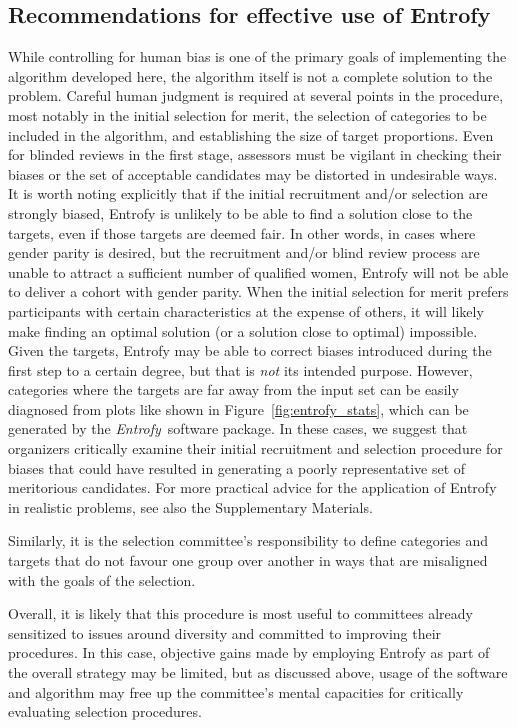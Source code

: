 \documentclass[12pt]{article}
\newcommand{\project}[1]{\textsl{#1}}
\newcommand{\entrofy}{\project{Entrofy}}
\begin{document}
\subsection*{Recommendations for effective use of Entrofy}
\begin{bf}
While controlling for human bias is one of the primary goals of implementing the algorithm developed here, the algorithm itself is not a complete solution to the problem.
Careful human judgment is required at several points in the procedure, most notably in the initial selection for merit, the selection of categories to be included in the algorithm, and establishing the size of target proportions.
Even for blinded reviews in the first stage, assessors must be vigilant in checking their biases or the set of acceptable candidates may be distorted in undesirable ways.
It is worth noting explicitly that if the initial recruitment and/or selection are strongly biased, Entrofy is unlikely to be able to find a solution close to the targets, even if those targets are deemed fair. 
In other words, in cases where gender parity is desired, but the recruitment and/or blind review process are unable to attract a sufficient number of qualified women, Entrofy will not be able to deliver a cohort with gender parity.
When the initial selection for merit prefers participants with certain characteristics at the expense of others, it will likely make finding an optimal solution (or a solution close to optimal) impossible.
Given the targets, Entrofy may be able to correct biases introduced during the first step to a certain degree, but that is \textit{not} its intended purpose.
However, categories where the targets are far away from the input set can be easily diagnosed from plots like shown in Figure~\ref{fig:entrofy_stats}, which can be generated by the \entrofy\ software package.
In these cases, we suggest that organizers critically examine their initial recruitment and selection procedure for biases that could have resulted in generating a poorly representative set of meritorious candidates. For more practical advice for the application of Entrofy in realistic problems, see also the Supplementary Materials.
\end{bf}

Similarly, it is the selection committee's responsibility to define categories and targets that do not favour one group over another in ways that are misaligned with the goals of the selection.
\begin{bf}
Overall, it is likely that this procedure is most useful to committees already sensitized to issues around diversity and committed to improving their procedures.
In this case, objective gains made by employing Entrofy as part of the overall strategy may be limited, but as discussed above, usage of the software and algorithm may free up the committee's mental capacities for critically evaluating selection procedures.
\end{bf}
\end{document}
